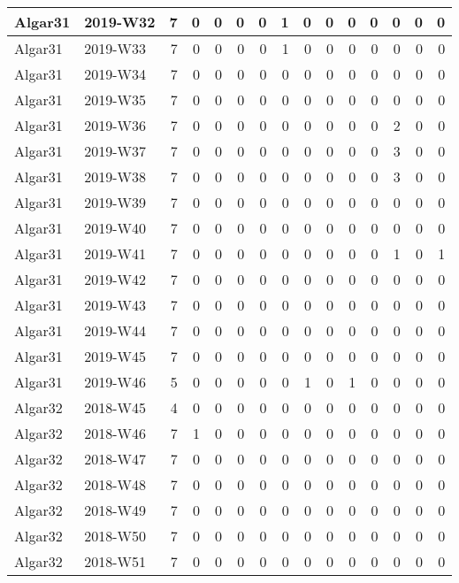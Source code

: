 \documentclass[]{book}
\begin{document}
\begin{table}
\begin{tabular}[t]{l|l|r|r|r|r|r|r|r|r|r|r|r|r|r}
\hline
Algar31 & 2019-W32 & 7 & 0 & 0 & 0 & 0 & 1 & 0 & 0 & 0 & 0 & 0 & 0 & 0\\
\hline
Algar31 & 2019-W33 & 7 & 0 & 0 & 0 & 0 & 1 & 0 & 0 & 0 & 0 & 0 & 0 & 0\\
\hline
Algar31 & 2019-W34 & 7 & 0 & 0 & 0 & 0 & 0 & 0 & 0 & 0 & 0 & 0 & 0 & 0\\
\hline
Algar31 & 2019-W35 & 7 & 0 & 0 & 0 & 0 & 0 & 0 & 0 & 0 & 0 & 0 & 0 & 0\\
\hline
Algar31 & 2019-W36 & 7 & 0 & 0 & 0 & 0 & 0 & 0 & 0 & 0 & 0 & 2 & 0 & 0\\
\hline
Algar31 & 2019-W37 & 7 & 0 & 0 & 0 & 0 & 0 & 0 & 0 & 0 & 0 & 3 & 0 & 0\\
\hline
Algar31 & 2019-W38 & 7 & 0 & 0 & 0 & 0 & 0 & 0 & 0 & 0 & 0 & 3 & 0 & 0\\
\hline
Algar31 & 2019-W39 & 7 & 0 & 0 & 0 & 0 & 0 & 0 & 0 & 0 & 0 & 0 & 0 & 0\\
\hline
Algar31 & 2019-W40 & 7 & 0 & 0 & 0 & 0 & 0 & 0 & 0 & 0 & 0 & 0 & 0 & 0\\
\hline
Algar31 & 2019-W41 & 7 & 0 & 0 & 0 & 0 & 0 & 0 & 0 & 0 & 0 & 1 & 0 & 1\\
\hline
Algar31 & 2019-W42 & 7 & 0 & 0 & 0 & 0 & 0 & 0 & 0 & 0 & 0 & 0 & 0 & 0\\
\hline
Algar31 & 2019-W43 & 7 & 0 & 0 & 0 & 0 & 0 & 0 & 0 & 0 & 0 & 0 & 0 & 0\\
\hline
Algar31 & 2019-W44 & 7 & 0 & 0 & 0 & 0 & 0 & 0 & 0 & 0 & 0 & 0 & 0 & 0\\
\hline
Algar31 & 2019-W45 & 7 & 0 & 0 & 0 & 0 & 0 & 0 & 0 & 0 & 0 & 0 & 0 & 0\\
\hline
Algar31 & 2019-W46 & 5 & 0 & 0 & 0 & 0 & 0 & 1 & 0 & 1 & 0 & 0 & 0 & 0\\
\hline
Algar32 & 2018-W45 & 4 & 0 & 0 & 0 & 0 & 0 & 0 & 0 & 0 & 0 & 0 & 0 & 0\\
\hline
Algar32 & 2018-W46 & 7 & 1 & 0 & 0 & 0 & 0 & 0 & 0 & 0 & 0 & 0 & 0 & 0\\
\hline
Algar32 & 2018-W47 & 7 & 0 & 0 & 0 & 0 & 0 & 0 & 0 & 0 & 0 & 0 & 0 & 0\\
\hline
Algar32 & 2018-W48 & 7 & 0 & 0 & 0 & 0 & 0 & 0 & 0 & 0 & 0 & 0 & 0 & 0\\
\hline
Algar32 & 2018-W49 & 7 & 0 & 0 & 0 & 0 & 0 & 0 & 0 & 0 & 0 & 0 & 0 & 0\\
\hline
Algar32 & 2018-W50 & 7 & 0 & 0 & 0 & 0 & 0 & 0 & 0 & 0 & 0 & 0 & 0 & 0\\
\hline
Algar32 & 2018-W51 & 7 & 0 & 0 & 0 & 0 & 0 & 0 & 0 & 0 & 0 & 0 & 0 & 0\\

\end{tabular}
\end{table}
\end{document}
